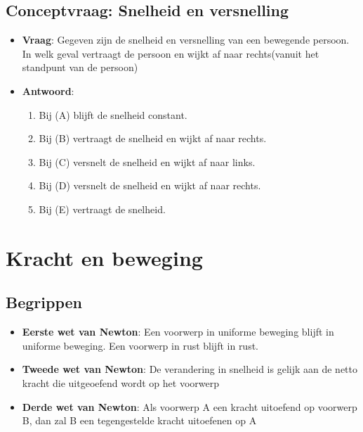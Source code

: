 \documentclass[12pt]{report}
\newcommand{\important}[1] {\textbf{\color{orange}#1}}
\begin{document}
\section{Conceptvraag: Snelheid en versnelling}
\begin{itemize}
\item {\textbf{Vraag}: Gegeven zijn de snelheid en versnelling van een bewegende persoon. In welk geval vertraagt de persoon en wijkt af naar rechts(vanuit het standpunt van de persoon)}
\item {\textbf{Antwoord}: \begin{enumerate}
    \item {Bij (A) blijft de snelheid constant.}
    \item {Bij (B) vertraagt de snelheid en wijkt af naar rechts.}
    \item {Bij (C) versnelt de snelheid en wijkt af naar links.}
    \item {Bij (D) versnelt de snelheid en wijkt af naar rechts.}
      \item {Bij (E) vertraagt de snelheid.}
    \end{enumerate}}
\end{itemize}



\chapter{Kracht en beweging}
\section{Begrippen}
\begin{itemize}
\item {\important{Eerste wet van Newton}: Een voorwerp in uniforme beweging blijft in uniforme beweging. Een voorwerp in 
rust blijft in rust.}
\item {\important{Tweede wet van Newton}: De verandering in snelheid is gelijk aan de netto kracht die uitgeoefend wordt op het voorwerp}
\item {\important{Derde wet van Newton}: Als voorwerp A een kracht uitoefend op voorwerp B, dan zal B een tegengestelde kracht uitoefenen op A}

\end{itemize}
\end{document}
